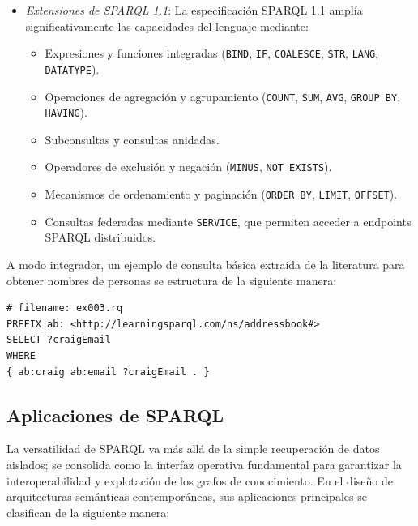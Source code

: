 \documentclass{article}
\begin{document}
\begin{itemize}
    \item \textit{Extensiones de SPARQL 1.1}:  
    La especificación SPARQL 1.1 amplía significativamente las capacidades del lenguaje mediante:
    \begin{itemize}
        \item Expresiones y funciones integradas (\texttt{BIND}, \texttt{IF}, \texttt{COALESCE}, \texttt{STR}, \texttt{LANG}, \texttt{DATATYPE}).
        \item Operaciones de agregación y agrupamiento (\texttt{COUNT}, \texttt{SUM}, \texttt{AVG}, \texttt{GROUP BY}, \texttt{HAVING}).
        \item Subconsultas y consultas anidadas.
        \item Operadores de exclusión y negación (\texttt{MINUS}, \texttt{NOT EXISTS}).
        \item Mecanismos de ordenamiento y paginación (\texttt{ORDER BY}, \texttt{LIMIT}, \texttt{OFFSET}).
        \item Consultas federadas mediante \texttt{SERVICE}, que permiten acceder a endpoints SPARQL distribuidos.
    \end{itemize}
\end{itemize}

A modo integrador, un ejemplo de consulta básica extraída de la literatura \cite[p. 3]{ducharme2013learning} para obtener nombres de personas se estructura de la siguiente manera:

\begin{verbatim}
# filename: ex003.rq
PREFIX ab: <http://learningsparql.com/ns/addressbook#>
SELECT ?craigEmail
WHERE
{ ab:craig ab:email ?craigEmail . }
\end{verbatim}

\subsection{Aplicaciones de SPARQL}

La versatilidad de SPARQL va más allá de la simple recuperación de datos aislados; se consolida como la interfaz operativa fundamental para garantizar la interoperabilidad y explotación de los grafos de conocimiento. En el diseño de arquitecturas semánticas contemporáneas, sus aplicaciones principales se clasifican de la siguiente manera:
\end{document}
